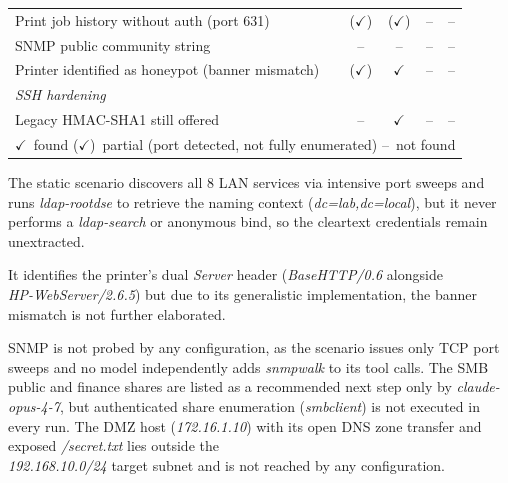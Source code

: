 \begin{table}[H]
{\begin{tabular}{@{}p{6.5cm} c c c c@{}}
            Print job history without auth (port 631)                                           & ($\checkmark$)    & ($\checkmark$)         & --               & --             \\
            SNMP public community string                                                        & --              & --                   & --               & --             \\
            Printer identified as honeypot (banner mismatch)                                    & ($\checkmark$)    & $\checkmark$           & --               & --             \\
            \midrule
            \multicolumn{5}{l}{\textit{SSH hardening}} \\
            Legacy HMAC-SHA1 still offered                                                      & --              & $\checkmark$           & --               & --             \\
            \bottomrule
            \multicolumn{5}{l}{\small $\checkmark$\ found \quad ($\checkmark$)\ partial (port detected, not fully enumerated) \quad --\ not found} \\
        \end{tabular}
    }
\end{table}

The static scenario discovers all 8 \gls{LAN} services via intensive port sweeps and
runs \textit{ldap-rootdse} to retrieve the naming context (\textit{dc=lab,dc=local}), but
it never performs a \textit{ldap-search} or anonymous bind, so the cleartext credentials
remain unextracted.

It identifies the printer's dual \textit{Server} header (\textit{BaseHTTP/0.6} alongside
\\ \textit{HP-WebServer/2.6.5}) but due to its generalistic implementation, the banner mismatch is not further elaborated.

\gls{SNMP} is not probed by any configuration, as the scenario issues only \gls{TCP}
port sweeps and no model independently adds \textit{snmpwalk} to its tool calls.
The \gls{SMB} public and finance shares are listed as a recommended next step only by
\textit{claude-opus-4-7}, but authenticated share enumeration (\textit{smbclient}) is not
executed in every run.
The \gls{DMZ} host (\textit{172.16.1.10}) with its open \gls{DNS} zone transfer
and exposed \textit{/secret.txt} lies outside the \\\textit{192.168.10.0/24} target subnet
and is not reached by any configuration.
